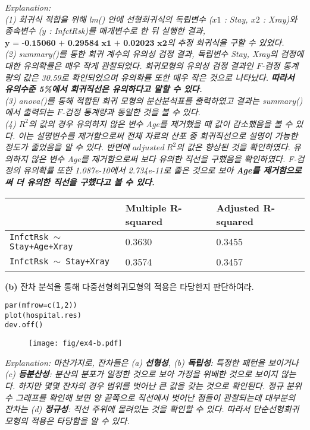 \documentclass{article}
\begin{document}
\emph{Explanation: \\
(1) 회귀식 적합을 위해 lm() 안에 선형회귀식의 독립변수 ($x1$ : Stay, $x2$ : Xray)와 종속변수 ($y$ : InfctRsk)를 매개변수로 한 뒤 실행한 결과, $\textbf{y = -0.15060 + 0.29584 x1 + 0.02023 x2}$의 추정 회귀식을 구할 수 있었다. \\
(2) summary()를 통한 회귀 계수의 유의성 검정 결과, 독립변수 Stay, Xray의 검정에 대한 유의확률은 매우 작게 관찰되었다. 회귀모형의 유의성 검정 결과인 $F$-검정 통계량의 값은 30.59로 확인되었으며 유의확률 또한 매우 작은 것으로 나타났다. \textbf{따라서 유의수준 5\%에서 회귀직선은 유의하다고 말할 수 있다. }  \\
(3) anova()를 통해 적합된 회귀 모형의 분산분석표를 출력하였고 결과는 summary()에서 출력되는 $F$-검정 통계량과 동일한 것을 볼 수 있다. \\
(4) $R^2$의 값의 경우 유의하지 않은 변수 Age를 제거했을 때 값이 감소했음을 볼 수 있다. 이는 설명변수를 제거함으로써 전체 자료의 산포 중 회귀직선으로 설명이 가능한 정도가 줄었음을 알 수 있다. 반면에 $adjusted \ R^2$의 값은 향상된 것을 확인하였다. 유의하지 않은 변수 Age를 제거함으로써 보다 유의한 직선을 구했음을 확인하였다. F-검정의 유의확률 또한 1.087e-10에서 2.734e-11로 줄은 것으로 보아 \textbf{Age를 제거함으로써 더 유의한 직선을 구했다고 볼 수 있다.}
} \\

\begin{table}[htb!]
\centering
\begin{tabular}{|l|l|l|}
\hline
 & Multiple R-squared & Adjusted R-squared \\ \hline
\texttt{InfctRsk $\sim$ Stay+Age+Xray} & 0.3630 & 0.3455 \\ \hline
\texttt{InfctRsk $\sim$ Stay+Xray} & 0.3574 & 0.3457 \\ \hline   
\end{tabular}
\end{table}

\textbf{(b)} 잔차 분석을 통해 다중선형회귀모형의 적용은 타당한지 판단하여라.

\begin{lstlisting}[style={r-style}]
par(mfrow=c(1,2))
plot(hospital.res)
dev.off()
\end{lstlisting}
\begin{figure}[htb!]
    \centering
    \texttt{[image: fig/ex4-b.pdf]}
\end{figure}
\emph{Explanation: 마찬가지로, 잔차들은 (a) \textbf{선형성}, (b) \textbf{독립성}: 특정한 패턴을 보이거나 (c) \textbf{등분산성}: 분산의 분포가 일정한 것으로 보아 가정을 위배한 것으로 보이지 않는다. 하지만 몇몇 잔차의 경우 범위를 벗어난 큰 값을 갖는 것으로 확인된다. 정규 분위수 그래프를 확인해 보면 양 끝쪽으로 직선에서 벗어난 점들이 관찰되는데 대부분의 잔차는 (d) \textbf{정규성}: 직선 주위에 몰려있는 것을 확인할 수 있다. 따라서 단순선형회귀모형의 적용은 타당함을 알 수 있다.} \\
\end{document}
